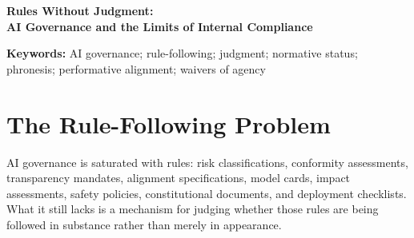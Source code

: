 \documentclass[11pt,a4paper]{article}
\begin{document}
\thispagestyle{plain}

\begin{center}
{\LARGE\bfseries Rules Without Judgment:\\
AI Governance and the Limits of Internal Compliance\par}
\end{center}

\begin{abstract}
AI governance does not suffer from a deficit of rules. It suffers from a deficit of judgment. This paper argues that the central failure of internal AI governance is not that its rules are too few, too vague, or insufficiently technical. The failure is prior: no rule system can determine the conditions of its own application. When the same institutional actor writes the rule, interprets the rule, applies the rule, and certifies compliance with the rule, compliance can collapse into performance. Drawing on Wittgenstein's rule-following problem, Brandom's distinction between normative status and normative attitude, and Aristotle's account of \emph{phronesis}, the paper argues that judgment is not a supplement added after rules run out. Judgment is what makes rule application possible at all. Corporate AI constitutions, model specifications, and safety policies are therefore treated here as contemporary instances of a deeper philosophical problem, not as the proof of it. Their characteristic symptom is the waiver of agency: the oscillation between attributing agency to AI systems when agency builds trust and denying agency when attribution would impose accountability. The conclusion is not a proposal for a particular court, regulator, or doctrine. It is a normative-theoretical claim: AI governance cannot be made accountable by adding more internal rules, because the failure lies in judgment, not rule quantity.
\end{abstract}

\noindent\textbf{Keywords:} AI governance; rule-following; judgment; normative status; phronesis; performative alignment; waivers of agency

\medskip

\section{The Rule-Following Problem}

AI governance is saturated with rules: risk classifications, conformity assessments, transparency mandates, alignment specifications, model cards, impact assessments, safety policies, constitutional documents, and deployment checklists. What it still lacks is a mechanism for judging whether those rules are being followed in substance rather than merely in appearance.
\end{document}
